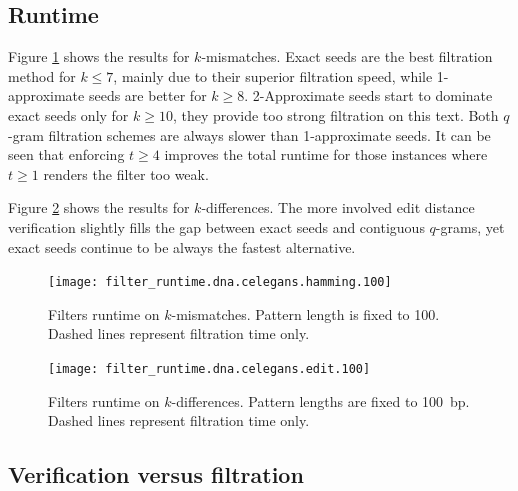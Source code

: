 \subsection{Runtime}

Figure \ref{fig:filter-runtime-hamming-celegans} shows the results for $k$-mismatches.
Exact seeds are the best filtration method for $k \leq 7$, mainly due to their superior filtration speed, while 1-approximate seeds are better for $k \geq 8$.
2-Approximate seeds start to dominate exact seeds only for $k \geq 10$, \ie they provide too strong filtration on this text.
Both $q$-gram filtration schemes are always slower than 1-approximate seeds.
It can be seen that enforcing $t \geq 4$ improves the total runtime for those instances where $t \geq 1$ renders the filter too weak.

Figure \ref{fig:filter-runtime-edit-celegans} shows the results for $k$-differences.
The more involved edit distance verification slightly fills the gap between exact seeds and contiguous $q$-grams, yet exact seeds continue to be always the fastest alternative.

\begin{figure}[h]
\begin{center}
\caption[Filters runtime on $k$-mismatches]{Filters runtime on $k$-mismatches. Pattern length is fixed to 100. Dashed lines represent filtration time only.}
\label{fig:filter-runtime-hamming-celegans}
\texttt{[image: filter\_runtime.dna.celegans.hamming.100]}
\end{center}
\end{figure}

\begin{figure}[h]
\begin{center}
\caption[Filters runtime on $k$-differences]{Filters runtime on $k$-differences. Pattern lengths are fixed to 100~bp. Dashed lines represent filtration time only.}
\label{fig:filter-runtime-edit-celegans}
\texttt{[image: filter\_runtime.dna.celegans.edit.100]}
\end{center}
\end{figure}

\subsection{Verification versus filtration}

